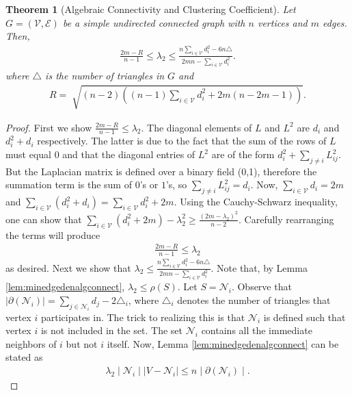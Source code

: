 \documentclass{amsart}
\newtheorem{theorem}{Theorem}
\theoremstyle{definition}
\theoremstyle{remark}
\numberwithin{equation}{section}
\def\cN{\mathcal{N}}
\def\cV{\mathcal{V}}
\def\cE{\mathcal{E}}
\begin{document}
\begin{theorem}[Algebraic Connectivity and Clustering Coefficient]\label{thrm:algTriangle}
Let $G = (\cV, \cE)$ be a simple undirected connected graph with $n$ vertices and $m$ edges. Then, 
\begin{align} \label{eq:nazInequality}
\frac{2m - R}{n-1} \leq \lambda_2 \leq \frac{n \displaystyle\sum_{i \in \cV}d_i^2 - 6n\triangle}{2mn - \displaystyle\sum_{i \in \cV} d_i^2}.
\end{align}
where $\triangle$ is the number of triangles in $G$ and
\begin{align*}
R = \sqrt[]{(n-2)\left ((n-1)\displaystyle\sum_{i \in \cV}d_i^2 + 2m(n-2m-1)\right)}.
\end{align*}
\end{theorem}
\begin{proof}
First we show $\displaystyle\frac{2m - R}{n-1} \leq \lambda_2$. The diagonal elements of $L$ and $L^2$ are $d_i$ and $d_i^2+d_i$ respectively. The latter is due to the fact that the sum of the rows of $L$ must equal $0$ and that the diagonal entries of $L^2$ are of the form $d_i^2 + \sum_{j\neq i}L_{ij}^2$. But the Laplacian matrix is defined over a binary field (0,1), therefore the summation term is the sum of $0$'s or $1$'s, so $\sum_{j\neq i}L_{ij}^2 = d_i$. Now, $\displaystyle\sum_{i \in \cV} d_i = 2m$ and $\displaystyle \sum_{i \in \cV}(d_i^2 + d_i) = \sum_{i \in \cV} d_i^2 + 2m$. Using the Cauchy-Schwarz inequality, one can show that $\displaystyle\sum_{i \in \cV} (d_i^2 + 2m) - \lambda_2^2 \geq \displaystyle\frac{(2m-\lambda_2)^2}{n-2}$. Carefully rearranging the terms will produce
\begin{align*}
\displaystyle\frac{2m - R}{n-1} \leq \lambda_2
\end{align*}
as desired. Next we show that $\lambda_2 \leq \frac{n \displaystyle\sum_{i \in \cV}d_i^2 - 6n\triangle}{2mn - \displaystyle\sum_{i \in \cV} d_i^2}$. Note that, by Lemma \ref{lem:minedgedenalgconnect}, $\displaystyle\lambda_2 \leq \rho(S)$. Let $S = \cN_i$. Observe that $\mid \partial (\cN_i) \mid = \displaystyle\sum_{j \in \cN_i} d_j - 2\triangle_i$, where $\triangle_i$ denotes the number of triangles that vertex $i$ participates in. The trick to realizing this is that $\cN_i$ is defined such that vertex $i$ is not included in the set. The set $\cN_i$ contains all the immediate neighbors of $i$ but not $i$ itself. Now, Lemma \ref{lem:minedgedenalgconnect} can be stated as
\begin{align*}
\lambda_2 \mid \cN_i \mid \mid V - \cN_i \mid \leq n \mid \partial(\cN_i) \mid.

\end{align*}
\end{proof}
\end{document}
